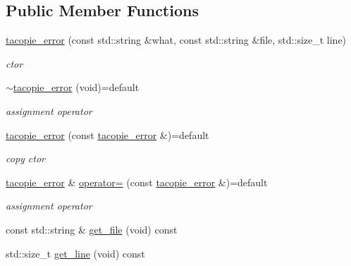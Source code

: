\subsection*{Public Member Functions}
\begin{DoxyCompactItemize}
\item 
\mbox{\label{classtacopie_1_1tacopie__error_a524fb8e9ac1825a57664421a3f32b9ce}} 
\hyperlink{classtacopie_1_1tacopie__error_a524fb8e9ac1825a57664421a3f32b9ce}{tacopie\+\_\+error} (const std\+::string \&what, const std\+::string \&file, std\+::size\+\_\+t line)
\begin{DoxyCompactList}\small\item\em ctor \end{DoxyCompactList}\item 
\mbox{\label{classtacopie_1_1tacopie__error_a5bf6b0967f7f4cf2b8f8d0a2ef0912b2}} 
\hyperlink{classtacopie_1_1tacopie__error_a5bf6b0967f7f4cf2b8f8d0a2ef0912b2}{$\sim$tacopie\+\_\+error} (void)=default
\begin{DoxyCompactList}\small\item\em assignment operator \end{DoxyCompactList}\item 
\mbox{\label{classtacopie_1_1tacopie__error_a0cb2a911165e08818ca03308891633e1}} 
\hyperlink{classtacopie_1_1tacopie__error_a0cb2a911165e08818ca03308891633e1}{tacopie\+\_\+error} (const \hyperlink{classtacopie_1_1tacopie__error}{tacopie\+\_\+error} \&)=default
\begin{DoxyCompactList}\small\item\em copy ctor \end{DoxyCompactList}\item 
\mbox{\label{classtacopie_1_1tacopie__error_ad30ae4932d33b460f75570f5f3a6e3f3}} 
\hyperlink{classtacopie_1_1tacopie__error}{tacopie\+\_\+error} \& \hyperlink{classtacopie_1_1tacopie__error_ad30ae4932d33b460f75570f5f3a6e3f3}{operator=} (const \hyperlink{classtacopie_1_1tacopie__error}{tacopie\+\_\+error} \&)=default
\begin{DoxyCompactList}\small\item\em assignment operator \end{DoxyCompactList}\item 
const std\+::string \& \hyperlink{classtacopie_1_1tacopie__error_a10360163c780a1bd9c95fcecca5aa6da}{get\+\_\+file} (void) const
\item 
std\+::size\+\_\+t \hyperlink{classtacopie_1_1tacopie__error_a39704d2cb6f076aa47d45f53f174b257}{get\+\_\+line} (void) const
\end{DoxyCompactItemize}


